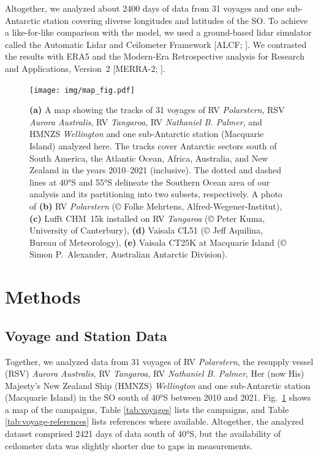\documentclass[draft]{agujournal2019}
\begin{document}
Altogether, we analyzed about 2400 days of data from 31 voyages and one sub-Antarctic station covering diverse longitudes and latitudes of the SO. To achieve a like-for-like comparison with the model, we used a ground-based lidar simulator called the Automatic Lidar and Ceilometer Framework [ALCF; ]. We contrasted the results with ERA5 \cite{era5} and the Modern-Era Retrospective analysis for Research and Applications, Version~2 [MERRA-2; ].

\begin{figure}[b!]
\centering
\texttt{[image: img/map\_fig.pdf]}
\caption{
\textbf{(a)} A map showing the tracks of 31 voyages of RV \emph{Polarstern}, RSV \emph{Aurora Australis}, RV \emph{Tangaroa}, RV \emph{Nathaniel B. Palmer}, and HMNZS \emph{Wellington} and one sub-Antarctic station (Macquarie Island) analyzed here. The tracks cover Antarctic sectors south of South America, the Atlantic Ocean, Africa, Australia, and New Zealand in the years 2010--2021 (inclusive). The dotted and dashed lines at 40°S and 55°S delineate the Southern Ocean area of our analysis and its partitioning into two subsets, respectively. A photo of \textbf{(b)} RV \emph{Polarstern} (© Folke Mehrtens, Alfred-Wegener-Institut), \textbf{(c)} Lufft CHM~15k installed on RV \emph{Tangaroa} (© Peter Kuma, University of Canterbury), \textbf{(d)} Vaisala CL51 (© Jeff Aquilina, Bureau of Meteorology), \textbf{(e)} Vaisala CT25K at Macquarie Island (© Simon P.\ Alexander, Australian Antarctic Division).
}
\label{fig:map}
\end{figure}

\section{Methods}
\label{sec:methods}

\subsection{Voyage and Station Data}

Together, we analyzed data from 31 voyages of RV \emph{Polarstern}, the resupply vessel (RSV) \emph{Aurora Australis}, RV \emph{Tangaroa}, RV \emph{Nathaniel B. Palmer}, Her (now His) Majesty's New Zealand Ship (HMNZS) \emph{Wellington} and one sub-Antarctic station (Macquarie Island) in the SO south of 40°S between 2010 and 2021. Fig.~\ref{fig:map} shows a map of the campaigns, Table \ref{tab:voyages} lists the campaigns, and Table \ref{tab:voyage-references} lists references where available. Altogether, the analyzed dataset comprised 2421 days of data south of 40°S, but the availability of ceilometer data was slightly shorter due to gaps in measurements.
\end{document}
